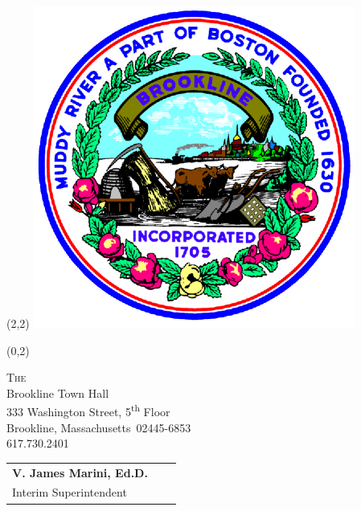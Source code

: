 \documentclass[11pt]{article}%
\def\docdate{2020/07/16}%
\def\docschooladdress{Brookline Town Hall\\333 Washington Street, 5\textsuperscript{th} Floor}
\def\docschoolcitystate{Brookline, Massachusetts}
\def\docschoolzip{02445-6853}
\def\docschoolphone{617.730.2401}
\begin{document}
\thispagestyle{first}

\setlength{\TPHorizModule}{.25in}
\setlength{\TPVertModule}{\TPHorizModule}
\textblockorigin{0.25in}{0.25in} %
\setlength{\parindent}{0pt}
\begin{textblock}{32}(2,2)
 \includegraphics*[scale = 0.175]{../images/TownofBrooklineLogo-color-400x400.png}
\end{textblock}
\begin{textblock}{32}(0,2)
 \begin{minipage}{\linewidth}\centering
  \large\textsc{The \docdistrict} \\
  \normalsize{\docschooladdress} \\
  \normalsize{\docschoolcitystate\ \docschoolzip} \\
  \normalsize{\docschoolphone}
 \end{minipage}
\end{textblock}

\begin{tabularx}{\textwidth}{@{}lXr@{}}\\[1.75cm]
 \normalsize{\bf V. James Marini, Ed.D.} && \large\bf\textit{} \\[-0.5\parskip] %
 \normalsize{Interim Superintendent} && \large\bf\textit{}
\end{tabularx}

\vspace{1cm}%
\end{document}
